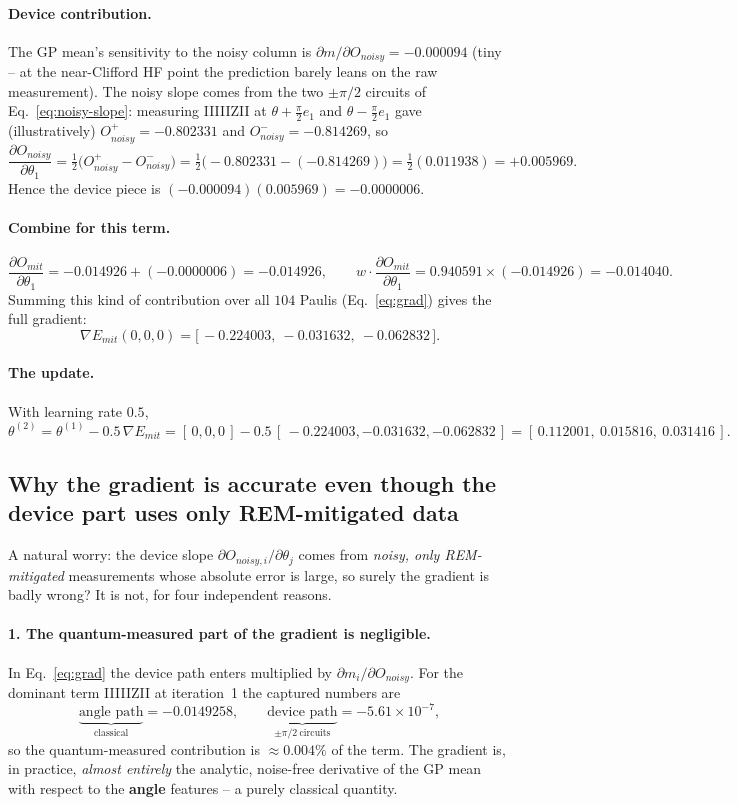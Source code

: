 \documentclass[11pt]{article}
\def\bm#1{#1}%
\def\texttt#1{#1}%
\def\mathrm#1{#1}%
\newcommand{\Emit}{E_{\mathrm{mit}}}
\begin{document}
\paragraph{Device contribution.} The GP mean's sensitivity to the noisy column is
$\partial m/\partial O_{\mathrm{noisy}}=-0.000094$ (tiny -- at the near-Clifford
HF point the prediction barely leans on the raw measurement). The noisy slope
comes from the two $\pm\pi/2$ circuits of Eq.~\eqref{eq:noisy-slope}: measuring
\texttt{IIIIIZII} at $\bm\theta+\tfrac\pi2\bm e_1$ and $\bm\theta-\tfrac\pi2\bm e_1$
gave (illustratively) $O_{\mathrm{noisy}}^{+}=-0.802331$ and
$O_{\mathrm{noisy}}^{-}=-0.814269$, so
\[
\frac{\partial O_{\mathrm{noisy}}}{\partial\theta_1}
=\tfrac12\big(O_{\mathrm{noisy}}^{+}-O_{\mathrm{noisy}}^{-}\big)
=\tfrac12\big(-0.802331-(-0.814269)\big)=\tfrac12(0.011938)=+0.005969 .
\]
Hence the device piece is
$(-0.000094)(0.005969)=-0.0000006$.
\paragraph{Combine for this term.}
\[
\frac{\partial O_{\mathrm{mit}}}{\partial\theta_1}=-0.014926+(-0.0000006)=-0.014926,
\qquad
w\cdot\frac{\partial O_{\mathrm{mit}}}{\partial\theta_1}=0.940591\times(-0.014926)=-0.014040.
\]
Summing this kind of contribution over all $104$ Paulis (Eq.~\eqref{eq:grad})
gives the full gradient:
\[
\nabla\Emit(0,0,0)=\big[\,-0.224003,\ -0.031632,\ -0.062832\,\big].
\]
\paragraph{The update.} With learning rate $0.5$,
\[
\bm\theta^{(2)}=\bm\theta^{(1)}-0.5\,\nabla\Emit
=[\,0,0,0\,]-0.5\,[\,-0.224003,-0.031632,-0.062832\,]
=[\,0.112001,\ 0.015816,\ 0.031416\,].
\]

\subsection{Why the gradient is accurate even though the device part uses only REM-mitigated data}
\label{sec:grad-accuracy}

A natural worry: the device slope $\partial O_{\mathrm{noisy},i}/\partial\theta_j$
comes from \emph{noisy, only REM-mitigated} measurements whose absolute error is
large, so surely the gradient is badly wrong? It is not, for four independent
reasons.

\paragraph{1. The quantum-measured part of the gradient is negligible.}
In Eq.~\eqref{eq:grad} the device path enters multiplied by
$\partial m_i/\partial O_{\mathrm{noisy}}$. For the dominant term \texttt{IIIIIZII}
at iteration~1 the captured numbers are
\[
\underbrace{\text{angle path}}_{\text{classical}}=-0.0149258,
\qquad
\underbrace{\text{device path}}_{\pm\pi/2\ \text{circuits}}=-5.61\times10^{-7},
\]
so the quantum-measured contribution is $\approx0.004\%$ of the term. The gradient
is, in practice, \emph{almost entirely} the analytic, noise-free derivative of the
GP mean with respect to the \textbf{angle} features -- a purely classical quantity.
\end{document}
